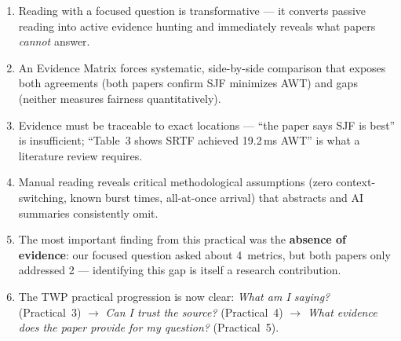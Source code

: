 \documentclass[11pt, a4paper]{article}
\begin{document}
\begin{enumerate}[nosep]
    \item Reading with a focused question is transformative --- it converts passive reading into active evidence hunting and immediately reveals what papers \emph{cannot} answer.
    \item An Evidence Matrix forces systematic, side-by-side comparison that exposes both agreements (both papers confirm SJF minimizes AWT) and gaps (neither measures fairness quantitatively).
    \item Evidence must be traceable to exact locations --- ``the paper says SJF is best'' is insufficient; ``Table~3 shows SRTF achieved 19.2\,ms AWT'' is what a literature review requires.
    \item Manual reading reveals critical methodological assumptions (zero context-switching, known burst times, all-at-once arrival) that abstracts and AI summaries consistently omit.
    \item The most important finding from this practical was the \textbf{absence of evidence}: our focused question asked about 4~metrics, but both papers only addressed 2 --- identifying this gap is itself a research contribution.
    \item The TWP practical progression is now clear: \textit{What am I saying?} (Practical~3) $\rightarrow$ \textit{Can I trust the source?} (Practical~4) $\rightarrow$ \textit{What evidence does the paper provide for my question?} (Practical~5).
\end{enumerate}
\end{document}

